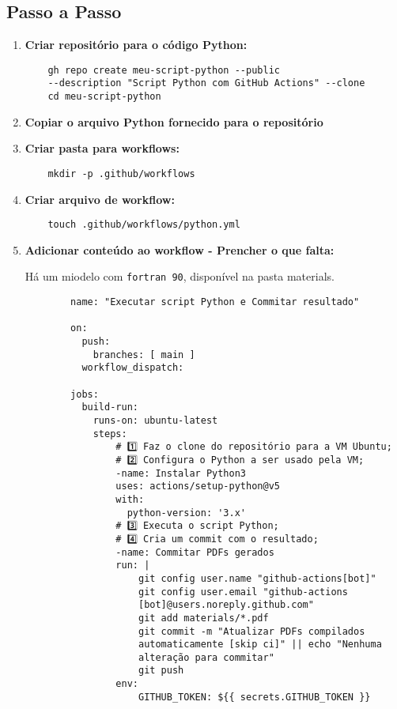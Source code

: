 \subsection{Passo a Passo}
\begin{enumerate}
    \item \textbf{Criar repositório para o código Python:}
    \begin{verbatim}
    gh repo create meu-script-python --public 
    --description "Script Python com GitHub Actions" --clone
    cd meu-script-python
    \end{verbatim}
    
    \item \textbf{Copiar o arquivo Python fornecido para o repositório}
    
    \item \textbf{Criar pasta para workflows:}
    \begin{verbatim}
    mkdir -p .github/workflows
    \end{verbatim}
    
    \item \textbf{Criar arquivo de workflow:}
    \begin{verbatim}
    touch .github/workflows/python.yml
    \end{verbatim}
    
    \item \textbf{Adicionar conteúdo ao workflow - Prencher o que falta:}
    \par
    Há um miodelo com \texttt{fortran 90}, disponível na pasta materials.
    \begin{verbatim}
        name: "Executar script Python e Commitar resultado"

        on:
          push:
            branches: [ main ]
          workflow_dispatch:

        jobs:
          build-run:
            runs-on: ubuntu-latest
            steps:
                # 1️⃣ Faz o clone do repositório para a VM Ubuntu;
                # 2️⃣ Configura o Python a ser usado pela VM;
                -name: Instalar Python3
                uses: actions/setup-python@v5
                with:
                  python-version: '3.x'
                # 3️⃣ Executa o script Python;
                # 4️⃣ Cria um commit com o resultado;
                -name: Commitar PDFs gerados
                run: |
                    git config user.name "github-actions[bot]"
                    git config user.email "github-actions
                    [bot]@users.noreply.github.com"
                    git add materials/*.pdf
                    git commit -m "Atualizar PDFs compilados
                    automaticamente [skip ci]" || echo "Nenhuma
                    alteração para commitar"
                    git push
                env:
                    GITHUB_TOKEN: ${{ secrets.GITHUB_TOKEN }}
    \end{verbatim}

\end{enumerate}
